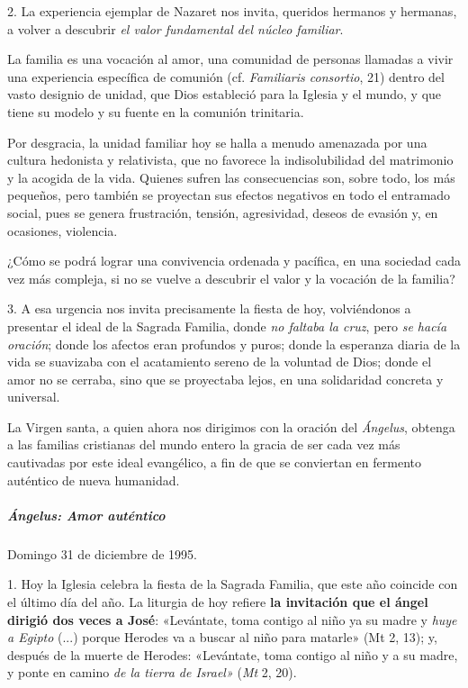 \documentclass[]{article}
\let\oldsubparagraph\subparagraph
\renewcommand{\subparagraph}[1]{\oldsubparagraph{#1}\mbox{}}
\begin{document}
2. La experiencia ejemplar de Nazaret nos invita, queridos hermanos y
hermanas, a volver a descubrir \emph{el valor fundamental del núcleo
familiar}.

La familia es una vocación al amor, una comunidad de personas llamadas a
vivir una experiencia específica de comunión (cf. \emph{Familiaris
consortio}, 21) dentro del vasto designio de unidad, que Dios estableció
para la Iglesia y el mundo, y que tiene su modelo y su fuente en la
comunión trinitaria.

Por desgracia, la unidad familiar hoy se halla a menudo amenazada por
una cultura hedonista y relativista, que no favorece la indisolubilidad
del matrimonio y la acogida de la vida. Quienes sufren las consecuencias
son, sobre todo, los más pequeños, pero también se proyectan sus efectos
negativos en todo el entramado social, pues se genera frustración,
tensión, agresividad, deseos de evasión y, en ocasiones, violencia.

¿Cómo se podrá lograr una convivencia ordenada y pacífica, en una
sociedad cada vez más compleja, si no se vuelve a descubrir el valor y
la vocación de la familia?

3. A esa urgencia nos invita precisamente la fiesta de hoy, volviéndonos
a presentar el ideal de la Sagrada Familia, donde \emph{no faltaba la
cruz}, pero \emph{se hacía oración}; donde los afectos eran profundos y
puros; donde la esperanza diaria de la vida se suavizaba con el
acatamiento sereno de la voluntad de Dios; donde el amor no se cerraba,
sino que se proyectaba lejos, en una solidaridad concreta y universal.

La Virgen santa, a quien ahora nos dirigimos con la oración del
\emph{Ángelus}, obtenga a las familias cristianas del mundo entero la
gracia de ser cada vez más cautivadas por este ideal evangélico, a fin
de que se conviertan en fermento auténtico de nueva humanidad.

\subparagraph{Ángelus: Amor
auténtico}\label{uxe1ngelus-amor-autuxe9ntico}

Domingo 31 de diciembre de 1995.

1. Hoy la Iglesia celebra la fiesta de la Sagrada Familia, que este año
coincide con el último día del año. La liturgia de hoy refiere
\textbf{la invitación que el ángel dirigió dos veces a José}:
«Levántate, toma contigo al niño ya su madre y \emph{huye a Egipto}
(...) porque Herodes va a buscar al niño para matarle» (Mt 2, 13); y,
después de la muerte de Herodes: «Levántate, toma contigo al niño y a su
madre, y ponte en camino \emph{de la tierra de Israel»} (\emph{Mt} 2,
20).
\end{document}
